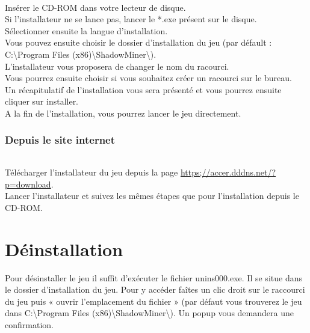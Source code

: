 \documentclass[titlepage, 13px, a4paper]{report}
\begin{document}
\paragraph*{} \hspace{0pt}
Insérer le CD-ROM dans votre lecteur de disque. \\
Si l'installateur ne se lance pas, lancer le *.exe présent sur le disque. \\
Sélectionner ensuite la langue d'installation. \\
Vous pouvez ensuite choisir le dossier d'installation du jeu 
(par défault : C:\textbackslash Program Files (x86)\textbackslash ShadowMiner\textbackslash). \\
L'installateur vous proposera de changer le nom du racourci. \\
Vous pourrez ensuite choisir si vous souhaitez créer un racourci sur le bureau. \\
Un récapitulatif de l'installation vous sera présenté et vous pourrez ensuite cliquer sur installer. \\
A la fin de l'installation, vous pourrez lancer le jeu directement. \\

\section{Depuis le site internet}
\paragraph*{} \hspace{0pt}
Télécharger l'installateur du jeu depuis la page \url{https;//accer.dddns.net/?p=download}. \\
Lancer l'installateur et suivez les mêmes étapes que pour l'installation depuis le CD-ROM. \\



\newpage


\part{Déinstallation} 

Pour désinstaller le jeu il suffit d'exécuter le fichier unins000.exe. 
Il se situe dans le dossier d'installation du jeu. Pour y accéder faîtes un clic droit sur le 
raccourci du jeu puis « ouvrir l'emplacement du fichier » (par défaut vous trouverez le jeu dans 
C:\textbackslash Program Files (x86)\textbackslash ShadowMiner\textbackslash). 
Un popup vous demandera une confirmation.\\
\end{document}
